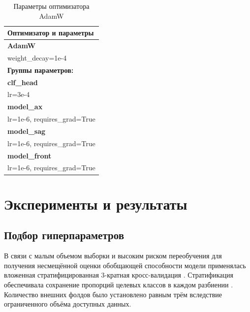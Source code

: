\documentclass[eqsecnum, authorsinfo]{kioj6}
\begin{document}
\begin{table}[htbp]
    \centering
    \caption{Параметры оптимизатора AdamW}
    \label{tab:optimizer}
    \renewcommand{\arraystretch}{1.2}
    \begin{tabularx}{\textwidth}{>{\ttfamily\footnotesize\raggedright\arraybackslash}X}
        \toprule
        \textnormal{\textbf{Оптимизатор и параметры}} \\
        \midrule
        \textnormal{\textbf{AdamW}} \\
        \quad weight\_decay=1e-4 \\
        \addlinespace
        
        \textnormal{\textbf{Группы параметров:}} \\
        \addlinespace
        
        \textnormal{\textbf{clf\_head}} \\
        \quad lr=3e-4 \\
        \addlinespace
        
        \textnormal{\textbf{model\_ax}} \\
        \quad lr=1e-6, requires\_grad=True \\
        \addlinespace
        
        \textnormal{\textbf{model\_sag}} \\
        \quad lr=1e-6, requires\_grad=True \\
        \addlinespace
        
        \textnormal{\textbf{model\_front}} \\
        \quad lr=1e-6, requires\_grad=True \\
        \bottomrule
    \end{tabularx}
\end{table}


\section{Эксперименты и результаты}

\subsection{Подбор гиперпараметров}
В связи с малым объемом выборки и высоким риском переобучения для получения несмещённой оценки обобщающей способности модели применялась 
вложенная стратифицированная 3-кратная кросс-валидация \cite{modelselectionstrategies,biasinerrorestimation}. Стратификация обеспечивала сохранение пропорций целевых классов в каждом разбиении \cite{studyofcross-validation}. 
Количество внешних фолдов было установлено равным трём вследствие ограниченного объёма доступных данных.
\end{document}
